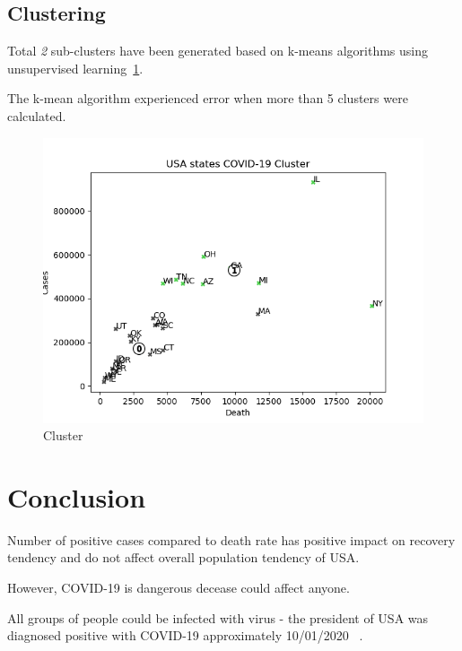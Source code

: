 \subsection{Clustering}
\label{subsec:clustering}

Total \textit{2} sub-clusters have been generated based on k-means algorithms using unsupervised learning~\ref{fig:states_cluster}.

The k-mean algorithm experienced error when more than 5 clusters were calculated.


\begin{figure}[h]
    \includegraphics*[width=\linewidth, keepaspectratio]{../src/output/cluster.png}
    \caption{Cluster}
    \label{fig:states_cluster}
\end{figure}




\section{Conclusion}
\label{sec:conclusion}

Number of positive cases compared to death rate has positive impact on recovery tendency and do not affect overall population tendency of USA\@.

However, COVID-19 is dangerous decease could affect anyone.

All groups of people could be infected with virus - the president of USA was diagnosed positive with COVID-19  approximately 10/01/2020 ~\cite{twitter-1311892190680014849}.

